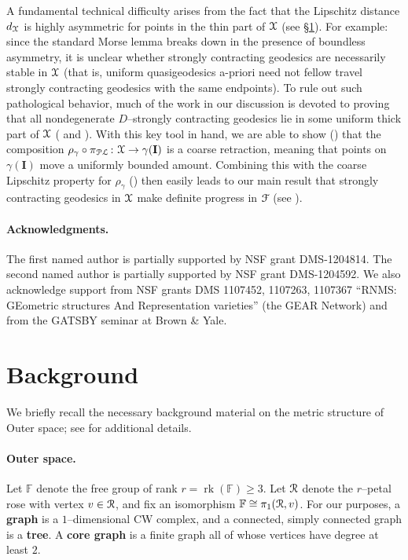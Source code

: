 \documentclass[letterpaper,fleqn]{article}
\theoremstyle{plain}
\theoremstyle{definition}
\newcommand{\define}[1]{\textbf{#1}}
\DeclareMathOperator{\rank}{rk}
\newcommand{\free}{\mathbb{F}} %
\newcommand{\factor}{{\EuScript F}} %
\newcommand{\fc}{\factor} %
\newcommand{\pl}{{\EuScript{PL}}} %
\newcommand{\os}{{\EuScript X}} %
\newcommand{\plproj}{\pi_\pl} %
\newcommand{\minlen}{m}  %
\newcommand{\minpts}{\rho} %
\newcommand{\rose}{{\EuScript R}} %
\newcommand{\I}{\mathbf{I}}
\begin{document}
A fundamental technical difficulty arises from the fact that the Lipschitz distance $d_\os$ is highly asymmetric for points in the thin part of $\os$ (see \S\ref{sec:background}). For example: since the standard Morse lemma breaks down in the presence of boundless asymmetry, it is unclear whether strongly contracting geodesics are necessarily stable in $\os$ (that is, uniform quasigeodesics a-priori need not fellow travel strongly contracting geodesics with the same endpoints). To rule out such pathological behavior, much of the work in our discussion is devoted to proving that all nondegenerate $D$--strongly contracting geodesics lie in some uniform thick part of $\os$ ( and ). With this key tool in hand, we are able to show () that the composition $\minpts_\gamma\circ \plproj\colon \os\to\gamma(\I)$ is a coarse retraction, meaning that points on $\gamma(\I)$ move a uniformly bounded amount. 
Combining this with the coarse Lipschitz property for $\minpts_\gamma$ () then easily leads to our main result that strongly contracting geodesics in $\os$ make definite progress in $\fc$ (see ).


\paragraph{Acknowledgments.} The first named author is partially supported by NSF grant DMS-1204814. The second named author is partially supported by NSF grant DMS-1204592. We also acknowledge support from NSF grants DMS 1107452, 1107263, 1107367 ``RNMS: GEometric structures And Representation varieties'' (the GEAR Network) and from the GATSBY seminar at Brown \& Yale.


\section{Background}\label{sec:background}
We briefly recall the necessary background material on the metric structure of Outer space; see \cite{FMout, BFhyp, DT1} for additional details.

\paragraph{Outer space.} Let $\free$ denote the free group of rank $r = \rank(\free) \ge 3$. 
Let $\rose$ denote the $r$--petal rose with vertex $v\in \rose$, and fix an isomorphism $\free\cong \pi_1(\rose,v)$. For our purposes, a \define{graph} is a $1$--dimensional CW complex, and a connected, simply connected graph is a \define{tree}. A \define{core graph} is a finite graph all of whose vertices have degree at least $2$.
\end{document}
